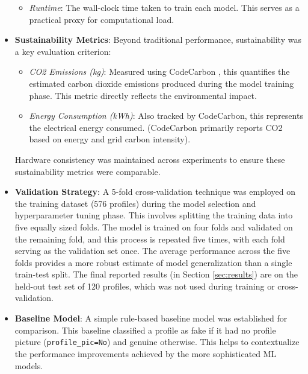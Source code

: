 \documentclass[conference]{IEEEtran}
\begin{document}
\begin{itemize}
\begin{itemize}
            \item \textit{Runtime}: The wall-clock time taken to train each model. This serves as a practical proxy for computational load.
        \end{itemize}
    \item \textbf{Sustainability Metrics}: Beyond traditional performance, sustainability was a key evaluation criterion:
        \begin{itemize}
            \item \textit{CO2 Emissions (kg)}: Measured using CodeCarbon \cite{b13}, this quantifies the estimated carbon dioxide emissions produced during the model training phase. This metric directly reflects the environmental impact.
            \item \textit{Energy Consumption (kWh)}: Also tracked by CodeCarbon, this represents the electrical energy consumed. (CodeCarbon primarily reports CO2 based on energy and grid carbon intensity).
        \end{itemize}
        Hardware consistency was maintained across experiments to ensure these sustainability metrics were comparable.
    \item \textbf{Validation Strategy}: A 5-fold cross-validation technique was employed on the training dataset (576 profiles) during the model selection and hyperparameter tuning phase. This involves splitting the training data into five equally sized folds. The model is trained on four folds and validated on the remaining fold, and this process is repeated five times, with each fold serving as the validation set once. The average performance across the five folds provides a more robust estimate of model generalization than a single train-test split. The final reported results (in Section \ref{sec:results}) are on the held-out test set of 120 profiles, which was not used during training or cross-validation.
    \item \textbf{Baseline Model}: A simple rule-based baseline model was established for comparison. This baseline classified a profile as fake if it had no profile picture (\texttt{profile\_pic=No}) and genuine otherwise. This helps to contextualize the performance improvements achieved by the more sophisticated ML models.
\end{itemize}
\end{document}
